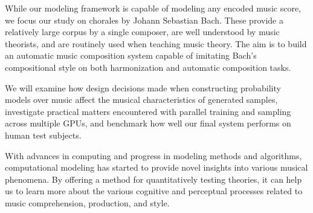While our modeling framework is capable of modeling any encoded music
score, we focus our study on chorales by Johann Sebastian Bach. These provide
a relatively large corpus by a single composer, are well understood by music
theorists, and are routinely used when teaching music theory.
The aim is to build an automatic music composition system capable of imitating
Bach's compositional style on both harmonization and automatic composition tasks.

We will examine how design decisions made when constructing probability models
over music affect the musical characteristics of generated samples, investigate
practical matters encountered with parallel training and sampling across
multiple GPUs, and benchmark how well our final system performs on human test
subjects.


With advances in computing and progress in modeling methods and algorithms,
computational modeling has started to provide novel insights into various
musical phenomena. By offering a method for quantitatively testing theories,
it can help us to learn more about the various cognitive and perceptual processes
related to music comprehension, production, and style.
